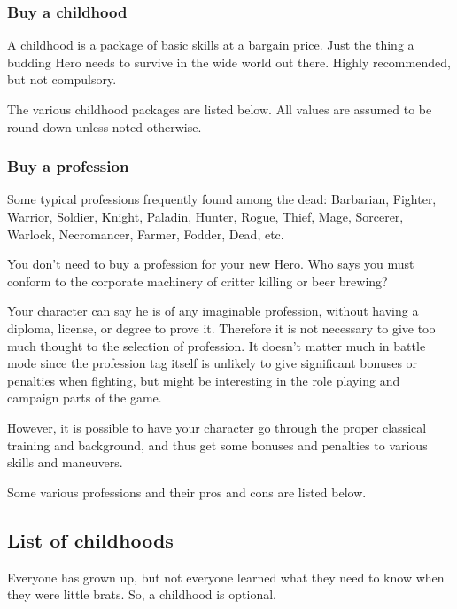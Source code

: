 \subsubsection*{Buy a childhood}
A childhood is a package of basic skills at a bargain price. Just the thing a budding Hero needs to survive in the wide world out there. Highly recommended, but not compulsory.

The various childhood packages are listed below.
All values are assumed to be round down unless noted otherwise.


\subsubsection*{Buy a profession}

Some typical professions frequently found among the dead: Barbarian, Fighter, Warrior, Soldier, Knight, Paladin, Hunter, Rogue, Thief, Mage, Sorcerer, Warlock, Necromancer, Farmer, Fodder, Dead, etc.

You don't need to buy a profession for your new Hero. Who says you must conform to the corporate machinery of critter killing or beer brewing?

Your character can say he is of any imaginable profession, without having a diploma, license, or degree to prove it. Therefore it is not necessary to give too much thought to the selection of profession. It doesn't matter much in battle mode since the profession tag itself is unlikely to give significant bonuses or penalties when fighting, but might be interesting in the role playing and campaign parts of the game.

However, it is possible to have your character go through the proper classical training and background, and thus get some bonuses and penalties to various skills and maneuvers.

Some various professions and their pros and cons are listed below.













\subsection*{List of childhoods}

Everyone has grown up, but not everyone learned what they need to know when they were little brats. So, a childhood is optional.


